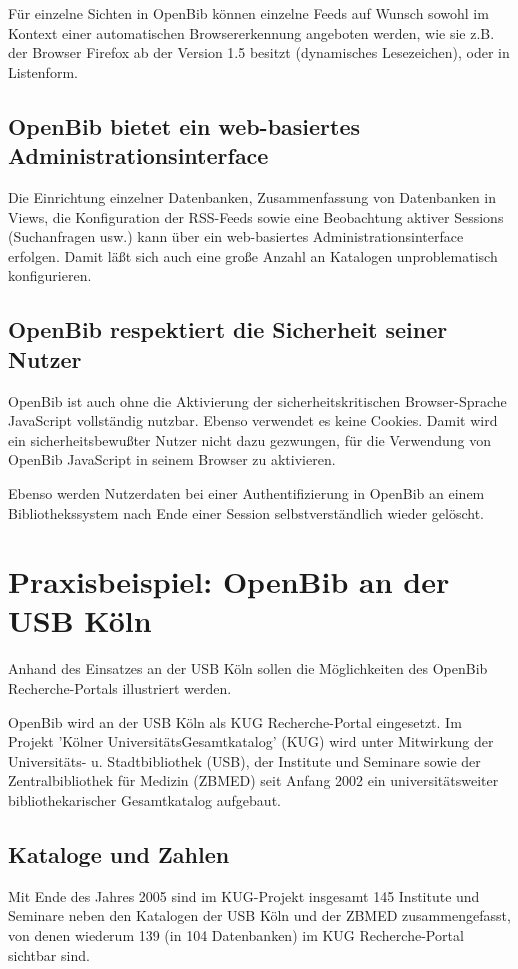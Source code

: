 \documentclass[11pt, twoside, a4paper, BCOR8mm, DIV12, bibtotoc,idxtotoc]{scrbook}
\begin{document}
Für einzelne Sichten in OpenBib können einzelne Feeds auf Wunsch
sowohl im Kontext einer automatischen Browsererkennung angeboten
werden, wie sie z.B. der Browser Firefox ab der Version 1.5 besitzt
(dynamisches Lesezeichen), oder in Listenform.

\section{OpenBib bietet ein web-basiertes Administrationsinterface}
Die Einrichtung einzelner Datenbanken, Zusammenfassung von Datenbanken
in Views, die Kon\-fi\-gu\-ra\-tion der RSS-Feeds sowie eine Beobachtung
aktiver Sessions (Suchanfragen usw.) kann über ein web-basiertes
Administrationsinterface erfolgen. Damit läßt sich auch eine große
Anzahl an Katalogen unproblematisch konfigurieren.

\section{OpenBib respektiert die Sicherheit seiner Nutzer}

OpenBib ist auch ohne die Aktivierung der sicherheitskritischen
Browser-Sprache JavaScript vollständig nutzbar. Ebenso verwendet es
keine Cookies. Damit wird ein sicherheitsbewußter Nutzer nicht dazu
gezwungen, für die Verwendung von OpenBib JavaScript in seinem
Browser zu aktivieren.

Ebenso werden Nutzerdaten bei einer Authentifizierung in OpenBib an
einem Bibliothekssystem nach Ende einer Session selbstverständlich
wieder gelöscht.

\chapter{Praxisbeispiel: OpenBib an der USB Köln}
Anhand des Einsatzes an der USB Köln sollen die Möglichkeiten des
OpenBib Recherche-Portals illustriert werden.

OpenBib wird an der USB Köln als KUG Recherche-Portal eingesetzt. Im
Projekt 'Kölner UniversitätsGesamtkatalog' (KUG) wird unter Mitwirkung
der Universitäts- u. Stadtbibliothek (USB), der Institute und Seminare
sowie der Zentralbibliothek für Medizin (ZBMED) seit Anfang 2002 ein
universitätsweiter bibliothekarischer Gesamtkatalog aufgebaut.

\section{Kataloge und Zahlen}
Mit Ende des Jahres 2005 sind im KUG-Projekt insgesamt 145 Institute
und Seminare neben den Katalogen der USB Köln und der ZBMED
zusammengefasst, von denen wiederum 139 (in 104 Datenbanken) im KUG
Recherche-Portal sichtbar sind. 
\end{document}
